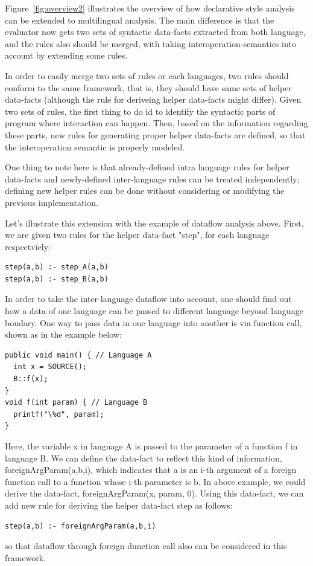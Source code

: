 Figure~\ref{fig:overview2} illustrates the overview of how declarative style analysis can be
extended to multilingual analysis. The main difference is that the evaluator
now gets two sets of syntactic data-facts extracted from both language, and the
rules also should be merged, with taking interoperation-semantics into account by
extending some rules.

In order to easily merge two sets of rules or each languages, two rules should
conform to the same framework, that is, they should have same sets of helper
data-facts (although the rule for deriveing helper data-facts might differ).
Given two sets of rules, the first thing to do id to identify the syntactic
parts of program where interaction can happen.  Then, based on the information
regarding these parts, new rules for generating proper helper data-facts are
defined, so that the interoperation semantic is properly modeled.

One thing to note here is that already-defined intra language rules for helper
data-facts and newly-defined inter-language rules can be treated independently;
defining new helper rules can be done without considering or modifying the 
previous implementation.

Let's illustrate this extension with the example of dataflow analysis above.
First, we are given two rules for the helper data-fact "step", for each language
respectviely:
\begin{lstlisting}[style=myDatalog,xleftmargin=2.5em]
step(a,b) :- step_A(a,b)
step(a,b) :- step_B(a,b)
\end{lstlisting}
In order to take the inter-language dataflow into account, one should find out
how a data of one language can be passed to different language beyond language
boudary.  One way to pass data in one language into another is via function
call, shown as in the example below:

\begin{lstlisting}[style=java,xleftmargin=2.5em]
public void main() { // Language A
  int x = SOURCE();
  B::f(x);
}
void f(int param) { // Language B
  printf("\%d", param);
}
\end{lstlisting}

Here, the variable x in language A is passed to the parameter of a function f
in language B. We can define the data-fact to reflect this kind of information,
foreignArgParam(a,b,i), which indicates that a is an i-th argument of a foreign
function call to a function whose i-th parameter is b. In above example, we
could derive the data-fact, foreignArgParam(x, param, 0). Using this data-fact,
we can add new rule for deriving the helper data-fact step as follows:
\begin{lstlisting}[style=myDatalog,xleftmargin=2.5em]
step(a,b) :- foreignArgParam(a,b,i)
\end{lstlisting}
so that dataflow through foreign dunction call also can be considered in this
framework.
